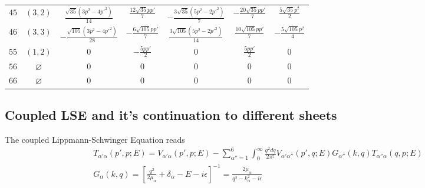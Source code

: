\documentclass[aps,prl,showpacs,amsmath,onecolumn,superscriptaddress,floatfix,nofootinbib,notitlepage]{revtex4-2}
\newcommand{\be}{\begin{equation}}
\newcommand{\ee}{\end{equation}}
\begin{document}
\begin{table}[t]
\begin{tabular}{cc|ccccc}
		$45$                  & $(3,2)$             & $\frac{\sqrt{35} (3 p^{2} - 4 p'^{2})}{14}$    & $\frac{12 \sqrt{35} p p'}{7}$   & $- \frac{3 \sqrt{35} (5 p^{2} - 2 p'^{2})}{7}$ & $- \frac{20 \sqrt{35} p p'}{7}$ & $\frac{5 \sqrt{35} p^{2}}{2}$    \\
		$46$                  & $(3,3)$             & $- \frac{\sqrt{105} (3 p^{2} - 4 p'^{2})}{28}$ & $- \frac{6 \sqrt{105} p p'}{7}$ & $\frac{3 \sqrt{105} (5 p^{2} - 2 p'^{2})}{14}$ & $\frac{10 \sqrt{105} p p'}{7}$  & $- \frac{5 \sqrt{105} p^{2}}{4}$ \\
		$55$                  & $(1,2)$             & $0$                                            & $- \frac{5 p p'}{2}$            & $0$                                            & $\frac{5 p p'}{2}$              & $0$                              \\
		$56$                  & $\varnothing$       & $0$                                            & $0$                             & $0$                                            & $0$                             & $0$                              \\
		$66$                  & $\varnothing$       & $0$                                            & $0$                             & $0$                                            & $0$                             & $0$                              \\
	\end{tabular}
	\endgroup
\end{table}

\subsection{Coupled LSE and it's continuation to different sheets}

The coupled Lippmann-Schwinger Equation reads
\be
\begin{aligned}
	T_{\alpha' \alpha}(p',p;E) = V_{\alpha' \alpha}(p',p;E) - \sum_{\alpha''=1}^{6}\int_0^\infty \frac{q^2dq}{2\pi^2}V_{\alpha'\alpha''}(p',q;E)G_{\alpha''}(k,q)T_{\alpha''\alpha}(q,p;E) \\
	G_\alpha(k,q) = \left[\frac{q^2}{2\mu_\alpha}+\delta_\alpha-E-i\epsilon\right]^{-1} = \frac{2\mu_\alpha}{q^2-k_\alpha^2-i\epsilon}
\end{aligned}
\ee
\end{document}
